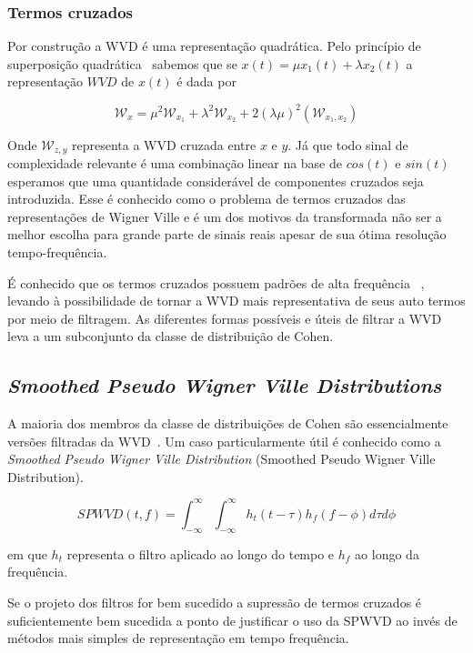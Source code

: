 \subsubsection{Termos cruzados}

Por construção a WVD é uma representação quadrática. Pelo princípio de
superposição quadrática~\cite{quadratic_freq_representation} sabemos que se
$x(t) = \mu x_1(t) + \lambda x_2(t)$ a representação $WVD$ de $x(t)$ é dada
por

$$ \mathcal{W}_{x} = \mu^2\mathcal{W}_{x_1} + \lambda^2\mathcal{W}_{x_2} + 2(\lambda\mu)^2(\mathcal{W}_{x_1 , x_2}) $$

Onde $\mathcal{W}_{z, y}$ representa a WVD cruzada entre $x$ e $y$. Já que todo
sinal de complexidade relevante é uma combinação linear na base de $cos(t)$ e
$sin(t)$ esperamos que uma quantidade considerável de componentes cruzados seja
introduzida. Esse é conhecido como o problema de termos cruzados das
representações de Wigner Ville e é um dos motivos da transformada não ser a
melhor escolha para grande parte de sinais reais apesar de sua ótima resolução
tempo-frequência.

É conhecido que os termos cruzados possuem padrões de alta frequência
~\cite{martin_lol}, levando à possibilidade de tornar a WVD mais representativa
de seus auto termos por meio de filtragem. As diferentes formas possíveis e
úteis de filtrar a WVD leva a um subconjunto da classe de distribuição de
Cohen.

\subsection{\emph{Smoothed Pseudo Wigner Ville Distributions}}

A maioria dos membros da classe de distribuições de Cohen são essencialmente
versões filtradas da WVD~\cite{tfr_comparison}. Um caso particularmente útil
é conhecido como a \emph{Smoothed Pseudo Wigner Ville Distribution}
(Smoothed Pseudo Wigner Ville Distribution).

$$ SPWVD(t, f) = \int_{-\infty}^{\infty}\int_{-\infty}^{\infty} h_t (t - \tau) h_f(f - \phi)d\tau d\phi $$

em que $h_t$ representa o filtro aplicado ao longo do tempo e $h_f$ ao longo
da frequência.

Se o projeto dos filtros for bem sucedido a supressão de termos cruzados é
suficientemente bem sucedida a ponto de justificar o uso da SPWVD ao invés de
métodos mais simples de representação em tempo frequência.
